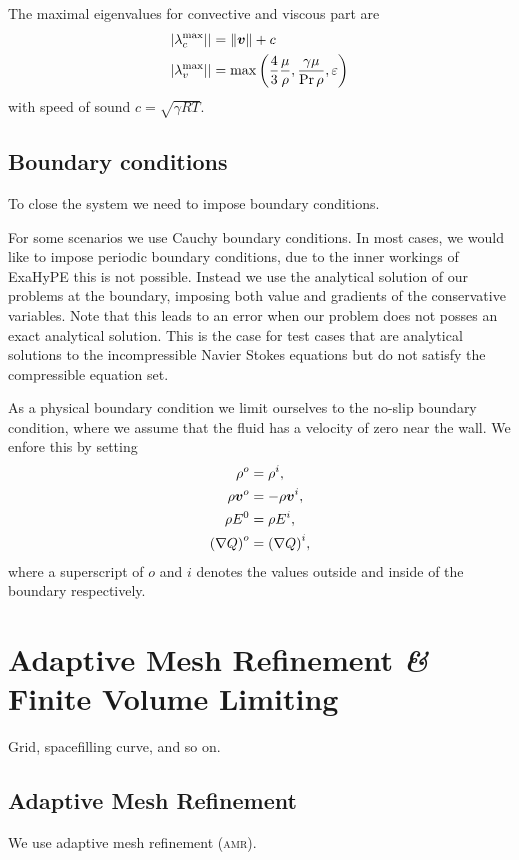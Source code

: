 The maximal eigenvalues for convective and viscous part are
\begin{align}
  \maxConvEigen \vert  &= \Vert \Qv \Vert + c\\
  \maxViscEigen \vert &= \max \left( \frac{4}{3} \frac{\mu}{\Qrho},
                        \frac{\gamma \mu}{\Pr \Qrho},
                        \diffCoeff \right)
\end{align}
with speed of sound $c = \sqrt{\gamma R T }$.

\subsection{Boundary conditions}
To close the system we need to impose boundary conditions.

For some scenarios we use Cauchy boundary conditions.
In most cases, we would like to impose periodic boundary conditions, due to the inner workings of ExaHyPE this is not possible.
Instead we use the analytical solution of our problems at the boundary, imposing both value and gradients of the conservative variables.
Note that this leads to an error when our problem does not posses an exact analytical solution.
This is the case for test cases that are analytical solutions to the incompressible Navier Stokes equations but do not satisfy the compressible equation set.

As a physical boundary condition we limit ourselves to the no-slip boundary condition, where we assume that the fluid has a velocity of zero near the wall.
We enfore this by setting
\begin{align}
  \label{eq:no-slip}
  \begin{split}
  \rho^o &= \rho^i, \\
  \rho \bm{v}^o &= -\rho \bm{v}^i, \\
  \rho E^0 &= \rho E^i,\\
  {(\nabla Q)}^o &= {(\nabla Q)}^i,
  \end{split}
\end{align}
where a superscript of $o$ and $i$ denotes the values outside and inside of the boundary respectively.

\section{Adaptive Mesh Refinement \textit{\&} Finite Volume Limiting}\label{sec:grid}
Grid, spacefilling curve, and so on.

\subsection{Adaptive Mesh Refinement}\label{sec:amr}
We use adaptive mesh refinement (\textsc{amr}).

